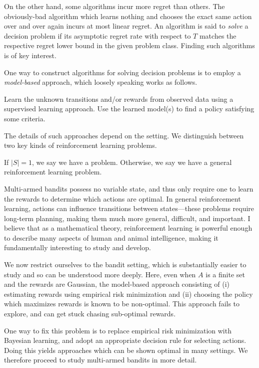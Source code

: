\documentclass[11pt]{book}
\begin{document}
On the other hand, some algorithms incur more regret than others.
The obviously-bad algorithm which learns nothing and chooses the exact same action over and over again incurs at most linear regret.
An algorithm is said to \emph{solve} a decision problem if its asymptotic regret rate with respect to $T$ matches the respective regret lower bound in the given problem class.
Finding such algorithms is of key interest.

One way to construct algorithms for solving decision problems is to employ a \emph{model-based} approach, which loosely speaking works as follows.

\1 Learn the unknown transitions and/or rewards from observed data using a supervised learning approach.
\2 Use the learned model(s) to find a policy satisfying some criteria.
\0 

The details of such approaches depend on the setting.
We distinguish between two key kinds of reinforcement learning problems.

\1 If $|S| = 1$, we say we have a  problem.
\2 Otherwise, we say we have a general reinforcement learning problem.
\0 

Multi-armed bandits possess no variable state, and thus only require one to learn the rewards to determine which actions are optimal.
In general reinforcement learning, actions can influence transitions between states---these problems require long-term planning, making them much more general, difficult, and important.
I believe that as a mathematical theory, reinforcement learning is powerful enough to describe many aspects of human and animal intelligence, making it fundamentally interesting to study and develop.

We now restrict ourselves to the bandit setting, which is substantially easier to study and so can be understood more deeply.
Here, even when $A$ is a finite set and the rewards are Gaussian, the model-based approach consisting of (i) estimating rewards using empirical risk minimization and (ii) choosing the policy which maximizes rewards is known to be non-optimal.
This approach fails to explore, and can get stuck chasing sub-optimal rewards.

One way to fix this problem is to replace empirical risk minimization with Bayesian learning, and adopt an appropriate decision rule for selecting actions.
Doing this yields approaches which can be shown optimal in many settings.
We therefore proceed to study multi-armed bandits in more detail.
\end{document}
